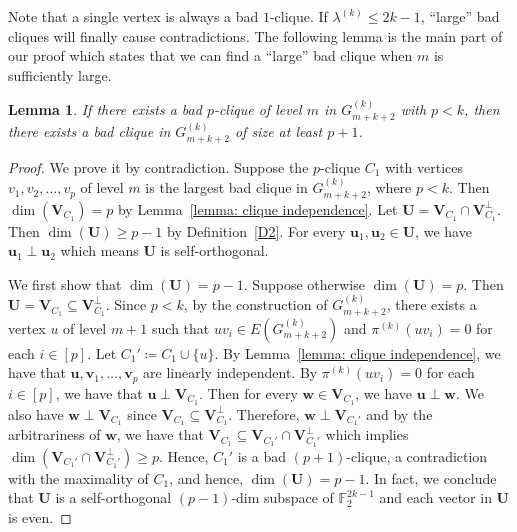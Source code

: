 \documentclass[
final
]{dmtcs-episciences}
\newtheorem{lemma}[theorem]{Lemma}
\begin{document}
Note that a single vertex is always a bad $1$-clique.
If $\lambda^{(k)} \le  2k-1$, ``large'' bad cliques will finally cause contradictions.
The following lemma is the main part of our proof which states that we can find a ``large'' bad clique when $m$ is sufficiently large.


\begin{lemma}\label{lemma: 0 sol independence}
        If there exists a bad $p$-clique of level $m$ in $G^{(k)}_{m+k+2}$ with $p < k$,
    then there exists a bad clique in $G^{(k)}_{m+k+2}$ of size at least $p+1$.
\end{lemma}

\begin{proof}
    We prove it by contradiction. Suppose the $p$-clique $C_1$ with vertices $v_1,v_2,\ldots, v_p$ of level $m$ is the largest bad clique in $G^{(k)}_{m+k+2}$, where $p<k$.  Then $\dim(\textbf{V}_{C_1})=p$ by Lemma~\ref{lemma: clique independence}.
    Let $\textbf{U}=\textbf{V}_{C_1}\cap \textbf{V}_{C_1}^{\perp}$. Then  $\dim(\textbf{U})\ge p-1$ by Definition~\ref{D2}. For every $\mathbf{u}_1, \mathbf{u}_2\in \textbf{U}$, we have $\mathbf{u}_1\perp \mathbf{u}_2$ which means $\textbf{U}$ is self-orthogonal.

    We first show that $\dim(\textbf{U})= p-1$. 
    Suppose otherwise $\dim(\textbf{U})= p$.
    Then $\textbf{U}=\textbf{V}_{C_1} \subseteq \textbf{V}_{C_1}^{\perp}$. Since $p<k$, by the construction of $G^{(k)}_{m+k+2}$,  there exists a vertex $u$ of level $m+1$ such that $uv_i\in E(G^{(k)}_{m+k+2})$ and $\pi^{(k)}(uv_i)=0$ for each $i\in[p]$. Let  $C_1' \coloneqq {C_1} \cup \{u\}$.
    By Lemma~\ref{lemma: clique independence}, we have that $\mathbf{u}, \mathbf{v}_1, \ldots, \mathbf{v}_p$ are linearly independent.
    By $\pi^{(k)}(uv_i)=0$ for each $i\in[p]$, we have that $\mathbf{u} \perp \textbf{V}_{C_1}$. 
    Then for every $\mathbf{w} \in \textbf{V}_{C_1}$, we have $\mathbf{u} \perp \mathbf{w}$. 
    We also have $\mathbf{w} \perp \textbf{V}_{C_1}$ since $\textbf{V}_{C_1} \subseteq \textbf{V}_{C_1}^{\perp}$.  Therefore, $\mathbf{w} \perp \textbf{V}_{C_1'}$ and by the arbitrariness of $\mathbf{w}$, we have that $\textbf{V}_{C_1} \subseteq \textbf{V}_{C_1'} \cap \textbf{V}_{C_1'}^{\perp}$ which implies $\dim(\textbf{V}_{C_1'} \cap \textbf{V}_{C_1'}^{\perp})\ge p$. Hence, $C_1'$ is a bad $(p+1)$-clique,  a contradiction with the maximality of ${C_1}$, and hence, $\dim(\textbf{U})= p-1$.
    In fact, we conclude that $\textbf{U}$ is a self-orthogonal $(p-1)$-dim subspace of $\mathbb{F}_2^{2k-1}$ and each vector in $\textbf{U}$ is even. 


\end{proof}
\end{document}

